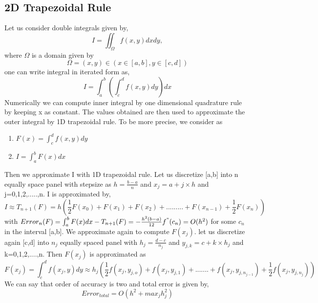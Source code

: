 \documentclass{article}
\begin{document}
\subsection{2D Trapezoidal Rule }
Let us consider double integrals given by, 
\begin{equation}
    I = \iint_\Omega f(x,y) dxdy,
\end{equation}
where $\Omega$ is a domain given by 
\begin{equation*}
    \Omega = {(x,y) \in ( x \in [a,b], y \in [c,d])}
\end{equation*}
one can write integral in iterated form as, 
\begin{equation*}
I = \int_{a}^b \left ( \int_{c}^d f(x,y) dy \right ) dx
\end{equation*}
Numerically we can compute inner integral by one dimensional quadrature rule by keeping x as constant. The values obtained are then used to approximate the outer integral by 1D trapezoidal rule. To be more precise, we consider as 
\begin{enumerate}
     \item $F(x)=\int_c^{d} f(x,y)dy$
     
    \item  $I = \int_a^{b} F(x)dx$
\end{enumerate}
Then we approximate I with 1D trapezoidal rule. Let us discretize [a,b] into n equally space panel with stepsize as 
$h=\frac{b-a}{n}$ and $x_j = a+j\times h$ and j=0,1,2,.....,n. I is approximated by, 
\begin{equation*}
    I \approx T_{n+1}(F) = h \left( \frac{1}{2} F(x_0) + F(x_1)+F(x_2)+.........+ F(x_{n-1})+\frac{1}{2}F(x_n) \right)
\end{equation*}
with $Error_n(F)= \int_a^{b}F(x)dx-T_{n+1}(F)=-\frac{h^2(b-a)}{12} f^{"}(c_n)=O(h^2)$ for some $c_n$ in the interval [a,b].
We approximate again to compute $F(x_j)$. let us discretize again [c,d] into $n_j$ equally spaced panel with $h_j = \frac{d-c}{n_j}$ and $y_{j,k}=c+k\times h_j$ and k=0,1,2,....,n. Then $F(x_j)$ is approximated as
\begin{equation*}
    F(x_j)=\int_c^{d}f(x_j,y)dy \approx h_j \left ( \frac{1}{2}f(x_j,y_{j,o})+f(x_j, y_{j,1})+.......+f(x_j, y_{j,n_{j-1}}) + \frac{1}{2} f(x_j,y_{j,n_j}) \right)
\end{equation*}
We can say that order of accuracy is two and total error is given by,
\begin{equation*}
    Error_{total} = O(h^2+max_j h_j^2)
\end{equation*}
\end{document}
